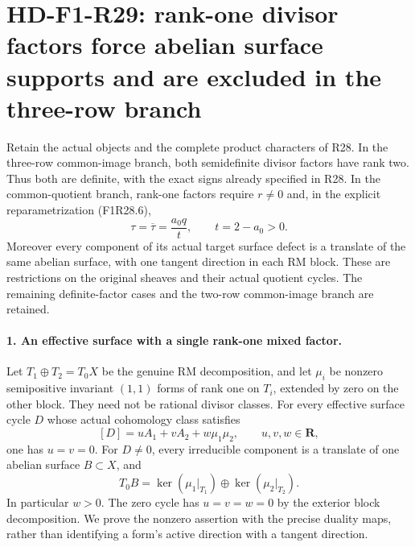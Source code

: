 \section[HD-F1-R29: rank-one factors force abelian supports]{HD-F1-R29: rank-one divisor factors force abelian surface supports and are excluded in the three-row branch}
\label{sec:followup-rm-rank-one-surface-support}

Retain the actual objects and the complete product
characters of R28. In the three-row common-image
branch, both semidefinite divisor factors have
rank two. Thus both are definite, with the exact
signs already specified in R28. In the
common-quotient branch, rank-one factors require
$r\ne0$ and, in the explicit reparametrization
(F1R28.6),
\[
       \tau=\overline\tau=\frac{a_0q}{t},\qquad
       t=2-a_0>0.
 \tag{F1R29.1}
\]
Moreover every component of its actual target
surface defect is a translate of the same
abelian surface, with one tangent direction in
each RM block. These are restrictions on the
original sheaves and their actual quotient
cycles. The remaining definite-factor cases
and the two-row common-image branch are retained.

\paragraph{1. An effective surface with a single rank-one mixed factor.}
Let $T_1\oplus T_2=T_0X$ be the genuine RM
decomposition, and let $\mu_i$ be nonzero
semipositive invariant $(1,1)$ forms of rank one
on $T_i$, extended by zero on the other block.
They need not be rational divisor classes.
For every effective surface cycle $D$ whose
actual cohomology class satisfies
\[
                 [D]=uA_1+vA_2+w\mu_1\mu_2,
                          \qquad u,v,w\in\mathbf R,
 \tag{F1R29.2}
\]
one has $u=v=0$. For $D\ne0$, every irreducible
component is a translate of one abelian surface
$B\subset X$, and
\[
          T_0B=\ker(\mu_1|_{T_1})
                       \oplus\ker(\mu_2|_{T_2}).
 \tag{F1R29.3}
\]
In particular $w>0$. The zero cycle has
$u=v=w=0$ by the exterior block decomposition.
We prove the nonzero assertion with the precise
duality maps, rather than identifying a form's
active direction with a tangent direction.

